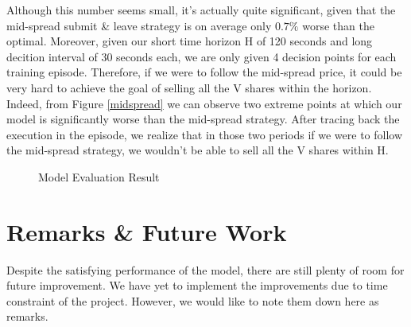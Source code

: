 \documentclass[12pt]{extarticle}
\begin{document}
\noindent Although this number seems small, it's actually quite significant, given that the
mid-spread submit \& leave strategy is on average only $0.7\%$ worse than the optimal.
Moreover, given our short time horizon H of 120 seconds and long decition interval
of 30 seconds each, we are only given 4 decision points for each training episode.
Therefore, if we were to follow the mid-spread price, it could be very hard to achieve the
goal of selling all the V shares within the horizon. Indeed, from Figure \ref{midspread}
we can observe two extreme points at which our model is significantly worse than
the mid-spread strategy. After tracing back the execution in the episode,
we realize that in those two periods if we were to follow the mid-spread strategy,
we wouldn't be able to sell all the V shares within H.

\begin{figure}[!htp]
  \centering
  \hfill
  \caption{Model Evaluation Result}
\end{figure}

\section{Remarks \& Future Work}
Despite the satisfying performance of the model, there are still plenty of room
for future improvement. We have yet to implement the improvements due to time constraint
of the project. However, we would like to note them down here as remarks.
\end{document}
